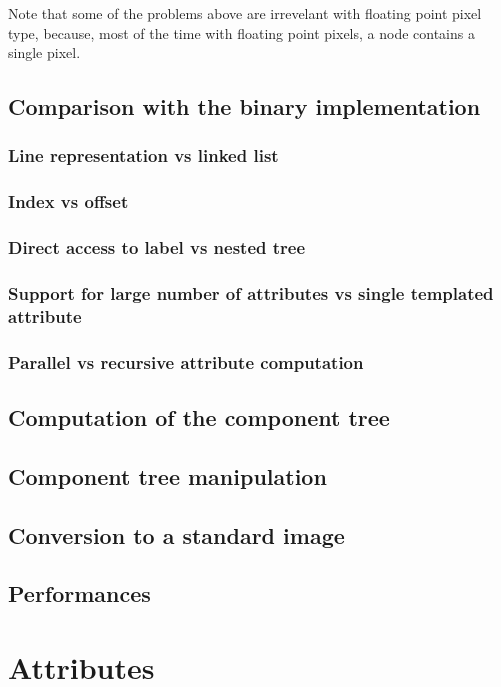 \documentclass{InsightArticle}
\begin{document}
Note that some of the problems above are irrevelant with floating point pixel type, because, most of the time with floating point pixels, a node contains a single pixel.

  \subsection{Comparison with the binary implementation}

    \subsubsection{Line representation vs linked list}
    \subsubsection{Index vs offset}
    \subsubsection{Direct access to label vs nested tree}
    \subsubsection{Support for large number of attributes vs single templated attribute}
    \subsubsection{Parallel vs recursive attribute computation}

  \subsection{Computation of the component tree}

  \subsection{Component tree manipulation}

  \subsection{Conversion to a standard image}

  \subsection{Performances}

\section{Attributes}
\end{document}
